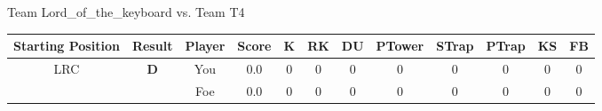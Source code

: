\documentclass[a4paper,12pt]{article}
\begin{document}
\begin{tabular}[t]{| c | c | c | c | c | c | c | c | c | c | c | c
      |}
                      
      
                      
      
                      
      
                      
      
                      
      
                      
                        \hline
                      \end{tabular}
                      
  \vspace*{2em}
  \par {\large {\color{Gray} Team} Lord\_of\_the\_keyboard {\color{Gray}
      vs. Team} T4}
  \newline
  \begin{tabular}[t]{| c | c | c | c | c | c | c | c | c | c | c | c
      |}
    \hline
    Starting Position & \textbf{Result} & Player & \textbf{Score} & K & RK & DU & PTower & STrap & PTrap & KS & FB \\
    
      
                      
      
                      
      
                      
      
                      
      
                      
      
        \hline
        \multirow{2}{*}{  LRC
             } &
              \multirow{2}{*}{  
                  \textbf{D}  } & 
                    \cellcolor{yellow!25} You & \cellcolor{yellow!25} 0.0 & \cellcolor{yellow!25} 0 &
                    \cellcolor{yellow!25} 0 & \cellcolor{yellow!25} 0 & \cellcolor{yellow!25} 0 &
                    \cellcolor{yellow!25} 0 & \cellcolor{yellow!25} 0 & \cellcolor{yellow!25} 0 &
                    \cellcolor{yellow!25} 0 \\
                    \cline{3-12}
                    & & \cellcolor{red!15} Foe & \cellcolor{red!15} 0.0 & \cellcolor{red!15} 0 & \cellcolor{red!15}
                    0 & \cellcolor{red!15} 0
                    & \cellcolor{red!15} 0 & \cellcolor{red!15}
                    0 & \cellcolor{red!15} 0 
                    & \cellcolor{red!15} 0 & \cellcolor{red!15}
                    0 \\
                    
                      
      
                      
      

\end{tabular}
\end{document}

